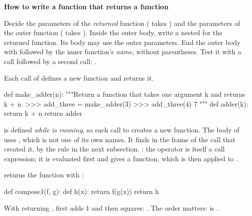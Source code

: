 \documentclass[10pt]{scrartcl}
\newenvironment{howto}[1]{\begin{mdframed}[style=howtostyle]{\color{NavyBlue}\textbf{#1}}\par\vspace{2pt}}{\end{mdframed}}
\begin{document}
\begin{howto}{How to write a function that returns a function}
\begin{steps}
  \ii Decide the parameters of the \emph{returned} function ( takes ) and the parameters of the outer function ( takes ).
  \ii Inside the outer body, write a nested  for the returned function. Its body may use the outer parameters.
  \ii End the outer body with  followed by the inner function's \emph{name}, without parentheses.
  \ii Test it with a call followed by a second call: .
\end{steps}
\end{howto}

\begin{example*}
Each call of  defines a new function and returns it.
\begin{py}
def make_adder(n):
    """Return a function that takes one argument k and returns k + n.
    >>> add_three = make_adder(3)
    >>> add_three(4)
    7
    """
    def adder(k):
        return k + n
    return adder
\end{py}
\begin{itemize}
  \ii {} is defined \emph{while  is running}, so each call to  creates a new  function.
  \ii The body of  uses , which is not one of its own names. It finds  in the frame of the  call that created it, by the rule in the next subsection.
  \ii {}: the operator  is itself a call expression; it is evaluated first and gives a function, which is then applied to .
\end{itemize}
\end{example*}

\begin{example*}
 returns the function  with :
\begin{py}
def compose1(f, g):
    def h(x):
        return f(g(x))
    return h
\end{py}
With  returning ,  first adds 1 and then squares: . The order matters:  is .
\end{example*}
\end{document}
